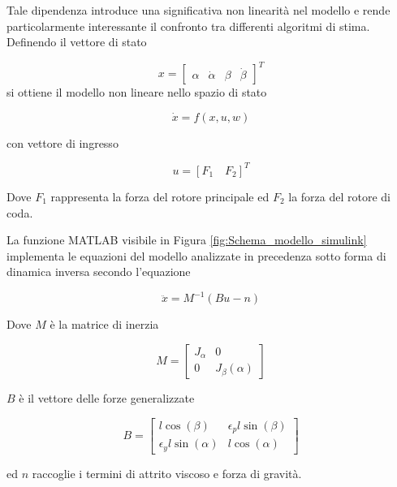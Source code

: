 \documentclass[12pt,a4paper]{article}
\begin{document}
Tale dipendenza introduce una significativa non linearità nel modello e rende particolarmente interessante il confronto tra differenti algoritmi di stima.
Definendo il vettore di stato

\begin{equation}
x = \begin{bmatrix} \alpha & \dot{\alpha} & \beta & \dot{\beta} \end{bmatrix}^{T}
\end{equation}
si ottiene il modello non lineare nello spazio di stato

\begin{equation}
\dot{x}=f(x,u,w)
\end{equation}

con vettore di ingresso 

\begin{equation}
u = [F_1 \quad F_2]^T
\end{equation}

Dove $F_1$ rappresenta la forza del rotore principale ed $F_2$ la forza
del rotore di coda.

La funzione MATLAB visibile in Figura \ref{fig:Schema_modello_simulink} implementa
le equazioni del modello analizzate in precedenza sotto forma di dinamica inversa
secondo l'equazione

\begin{equation}
\ddot{x} = M^{-1}(Bu - n)
\end{equation}

Dove $M$ è la matrice di inerzia

\begin{equation}
    M =
    \begin{bmatrix}
        J_{\alpha} & 0  \\
        0 & J_{\beta}(\alpha)
    \end{bmatrix}
\end{equation}

$B$ è il vettore delle forze generalizzate

\begin{equation}
    B =
    \begin{bmatrix}
        l\cos(\beta) & \epsilon_pl\sin(\beta) \\
        \epsilon_yl\sin(\alpha) & l\cos(\alpha)
    \end{bmatrix}
\end{equation}

ed $n$ raccoglie i termini di attrito viscoso e forza di gravità.
\end{document}
